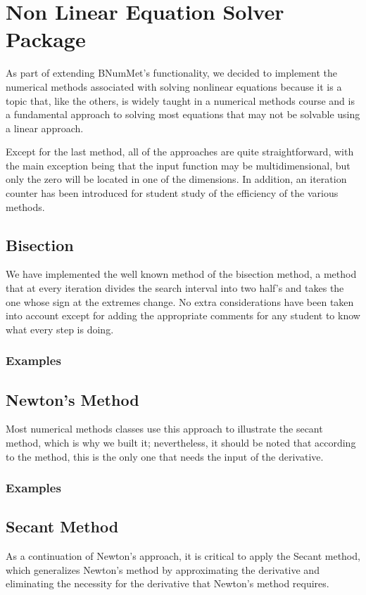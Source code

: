 \section{Non Linear Equation Solver Package}
As part of extending BNumMet's functionality, we decided to implement the numerical methods associated with solving nonlinear equations because it is a topic that, like the others, is widely taught in a numerical methods course and is a fundamental approach to solving most equations that may not be solvable using a linear approach.

Except for the last method, all of the approaches are quite straightforward, with the main exception being that the input function may be multidimensional, but only the zero will be located in one of the dimensions. In addition, an iteration counter has been introduced for student study of the efficiency of the various methods.

\subsection{Bisection}
We have implemented the well known method of the bisection method, a method that at every iteration divides the search interval into two half's and takes the one whose sign at the extremes change. No extra considerations have been taken into account except for adding the appropriate comments for any student to know what every step is doing.
\subsubsection{Examples}
	

\subsection{Newton's Method}
Most numerical methods classes use this approach to illustrate the secant method, which is why we built it; nevertheless, it should be noted that according to the method, this is the only one that needs the input of the derivative.
\subsubsection{Examples}
	


\subsection{Secant Method}
As a continuation of Newton's approach, it is critical to apply the Secant method, which generalizes Newton's method by approximating the derivative and eliminating the necessity for the derivative that Newton's method requires. 
